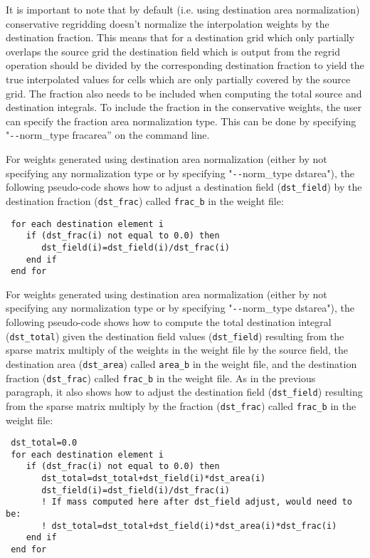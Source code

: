  It is important to note that by default (i.e. using destination area normalization) conservative regridding doesn't normalize the interpolation weights by the destination fraction. This means that for a destination grid which only partially overlaps the source grid the destination field which is output from the regrid operation should be divided by the corresponding destination fraction to yield the true interpolated values for cells which are only partially covered by the source grid.
The fraction also needs to be included when computing the total source and destination integrals. To include the fraction in the conservative weights, the user can specify the fraction area normalization type. This can be done by specifying "\verb+--+norm\_type fracarea'' on the command line. 

For weights generated using destination area normalization (either by not specifying any normalization type or by specifying "\verb+--+norm\_type dstarea"), 
the following pseudo-code shows how to adjust a destination field ({\tt dst\_field}) by the destination fraction ({\tt dst\_frac}) called {\tt frac\_b} in the weight file:

\begin{verbatim}
 for each destination element i
    if (dst_frac(i) not equal to 0.0) then
       dst_field(i)=dst_field(i)/dst_frac(i)
    end if
 end for
\end{verbatim}

For weights generated using destination area normalization (either by not specifying any normalization type or by specifying "\verb+--+norm\_type dstarea"), 
the following pseudo-code shows how to compute the total destination integral ({\tt dst\_total}) given the destination field values ({\tt dst\_field}) resulting
from the sparse matrix multiply of the weights in the weight file by the source field, the destination area ({\tt dst\_area}) called {\tt area\_b} in the
weight file, and the destination fraction ({\tt dst\_frac}) called {\tt frac\_b} in the weight file. As in the previous paragraph, it also
shows how to adjust the destination field ({\tt dst\_field}) resulting from the sparse matrix multiply by the fraction
({\tt dst\_frac}) called {\tt frac\_b} in the weight file:

\begin{verbatim}
 dst_total=0.0
 for each destination element i
    if (dst_frac(i) not equal to 0.0) then
       dst_total=dst_total+dst_field(i)*dst_area(i)
       dst_field(i)=dst_field(i)/dst_frac(i)
       ! If mass computed here after dst_field adjust, would need to be:
       ! dst_total=dst_total+dst_field(i)*dst_area(i)*dst_frac(i)
    end if
 end for
\end{verbatim}

